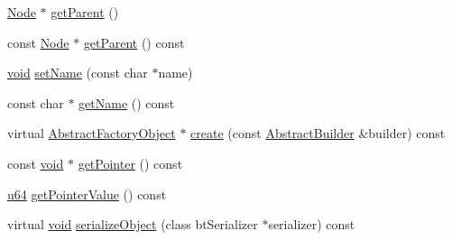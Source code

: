 \begin{DoxyCompactItemize}
\item 
\mbox{\hyperlink{classnjli_1_1_node}{Node}} $\ast$ \mbox{\hyperlink{classnjli_1_1_sound_a14a65624a35ac8b64585bdabf001cdee}{get\+Parent}} ()
\item 
const \mbox{\hyperlink{classnjli_1_1_node}{Node}} $\ast$ \mbox{\hyperlink{classnjli_1_1_sound_aba51bc1bd1f8b72ae6a02caa706f30c4}{get\+Parent}} () const
\item 
\mbox{\hyperlink{_thread_8h_af1e856da2e658414cb2456cb6f7ebc66}{void}} \mbox{\hyperlink{classnjli_1_1_sound_a087eb5f8d9f51cc476f12f1d10a3cb95}{set\+Name}} (const char $\ast$name)
\item 
const char $\ast$ \mbox{\hyperlink{classnjli_1_1_sound_ad41266885be835f3ee602311e20877a4}{get\+Name}} () const
\item 
virtual \mbox{\hyperlink{classnjli_1_1_abstract_factory_object}{Abstract\+Factory\+Object}} $\ast$ \mbox{\hyperlink{classnjli_1_1_sound_a83a8876ae63b92804004cf3febe76573}{create}} (const \mbox{\hyperlink{classnjli_1_1_abstract_builder}{Abstract\+Builder}} \&builder) const
\item 
const \mbox{\hyperlink{_thread_8h_af1e856da2e658414cb2456cb6f7ebc66}{void}} $\ast$ \mbox{\hyperlink{classnjli_1_1_sound_ac4ca71716ed832be357f15f8262c8448}{get\+Pointer}} () const
\item 
\mbox{\hyperlink{_util_8h_ad758b7a5c3f18ed79d2fcd23d9f16357}{u64}} \mbox{\hyperlink{classnjli_1_1_sound_a4ffddf141a426a5a07d0ac19f1913811}{get\+Pointer\+Value}} () const
\item 
virtual \mbox{\hyperlink{_thread_8h_af1e856da2e658414cb2456cb6f7ebc66}{void}} \mbox{\hyperlink{classnjli_1_1_sound_a4fc4bcd9d1930911474210c047372fc0}{serialize\+Object}} (class bt\+Serializer $\ast$serializer) const
\end{DoxyCompactItemize}
